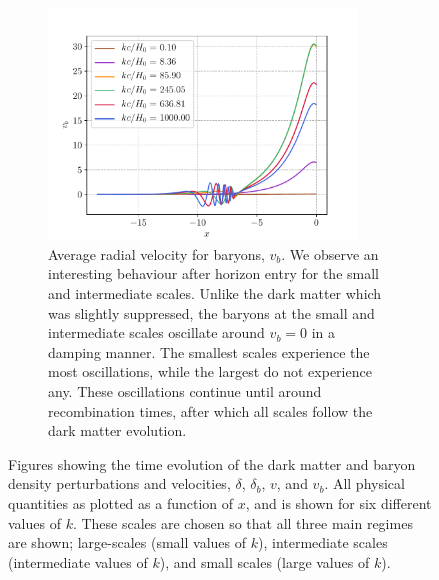 \documentclass[a4paper, 10pt, reqno]{amsart}
\begin{document}
\begin{figure}
{\begin{subfigure}[t]{0.7\textwidth}
    \includegraphics[width=0.9\textwidth]{figures/v_b.pdf} 
    \caption{Average radial velocity for baryons, $v_b$. We observe an interesting behaviour after horizon entry for the small and intermediate scales. Unlike the dark matter which was slightly suppressed, the baryons at the small and intermediate scales oscillate around $v_b = 0$ in a damping manner. The smallest scales experience the most oscillations, while the largest do not experience any. These oscillations continue until around recombination times, after which all scales follow the dark matter evolution. } 
    \label{fig: 1d} 
  \end{subfigure} 
  }
  \caption{Figures showing the time evolution of the dark matter and baryon density perturbations and velocities, $\delta$, $\delta_b$, $v$, and $v_b$. All physical quantities as plotted as a function of $x$, and is shown for six different values of $k$. These scales are chosen so that all three main regimes are shown; large-scales (small values of $k$), intermediate scales (intermediate values of $k$), and small scales (large values of $k$).}
  \label{fig: 1} 
\end{figure}
\end{document}
